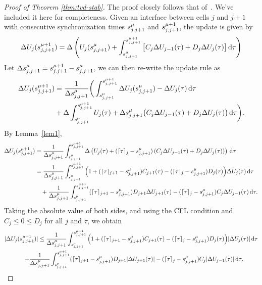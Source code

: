 \begin{proof}[Proof of Theorem \ref{thm:tvd-stab}]
The proof closely follows that of~\cite{Kirby2003}. We've included it here for completeness.
Given an interface between cells $j$ and $j+1$ with consecutive synchronization times $s^{\mu}_{j,j+1}$ and $s^{\mu+1}_{j,j+1}$, the update is given by
\begin{equation*}
\Delta U_j (s^{\mu+1}_{j,j+1}) = \Delta \left( U_j(s^{\mu}_{j,j+1}) + \int_{s^{\mu}_{j,j+1}}^{s^{\mu+1}_{j,j+1}} \big[ C_j \Delta U_{j-1} (\tau) + D_j \Delta U_{j} (\tau) \big] \,\mathrm{d} \tau \right)
\end{equation*}
Let $\Delta s^{\mu}_{j,j+1} = s^{\mu+1}_{j,j+1} - s^{\mu}_{j,j+1}$, we can then re-write the update rule as
\begin{align*}
\Delta U_j (s^{\mu+1}_{j,j+1} ) &= \frac{1}{\Delta s^{\mu}_{j,j+1}} \bigg( \int_{s^{\mu}_{j,j+1}}^{s^{\mu+1}_{j,j+1}} \Delta U_j(s^{\mu}_{j,j+1}) - \Delta U_j(\tau) \,\mathrm{d} \tau \\
& + \Delta \int_{s^{\mu}_{j,j+1}}^{s^{\mu+1}_{j,j+1}} U_j(\tau) + \Delta s^{\mu}_{j,j+1} \big( C_j \Delta U_{j-1}(\tau) + D_j \Delta U_j(\tau) \big) \,\mathrm{d} \tau \bigg). \\
\end{align*}
By Lemma~\ref{lem1},
\begin{align*}
\Delta U_j (s^{\mu+1}_{j,j+1} ) &= \frac{1}{\Delta s^{\mu}_{j,j+1}} \int_{s^{\mu}_{j,j+1}}^{s^{\mu+1}_{j,j+1}} 
\Delta \left( U_j(\tau) +  (\lceil \tau \rceil_j - s^{\mu}_{j,j+1} ) \left( C_j \Delta U_{j-1}(\tau) + D_j \Delta U_j(\tau) \right) \right)\,\mathrm{d} \tau\\
&= \frac{1}{\Delta s^{\mu}_{j,j+1}} \int_{s^{\mu}_{j,j+1}}^{s^{\mu+1}_{j,j+1}} \Big( 1 + ( \lceil \tau \rceil_{j+1} - s^{\mu}_{j,j+1} ) C_{j+1}(\tau) - ( \lceil \tau \rceil_j - s^{\mu}_{j,j+1} ) D_{j}(\tau) \Big) \Delta U_j(\tau) \,\mathrm{d} \tau\\
&\quad + \frac{1}{\Delta s^{\mu}_{j,j+1}} \int_{s^{\mu}_{j,j+1}}^{s^{\mu+1}_{j,j+1}} ( \lceil \tau \rceil_{j+1} - s^{\mu}_{j,j+1} ) D_{j+1} \Delta U_{j+1}(\tau) - ( \lceil \tau \rceil_j - s^{\mu}_{j,j+1} )  C_j \Delta U_{j-1} (\tau) \,\mathrm{d} \tau.
\end{align*}
Taking the absolute value of both sides, and using the CFL condition and $C_j \le 0 \le D_j$ for all $j$ and $\tau$, we obtain
\begin{multline}  \label{eq:thm1-pfa}
|\Delta U_j (\ssyncnext)| \le \frac{1}{\Delta \ssync} \int_{\ssync}^{\ssyncnext} \Big( 1 + ( \lceil \tau \rceil_{j+1} - \ssync ) C_{j+1}(\tau) - ( \lceil \tau \rceil_j - \ssync ) D_{j}(\tau) \Big) |\Delta U_j(\tau)| \,\mathrm{d} \tau\\
\quad + \frac{1}{\Delta \ssync} \int_{\ssync}^{\ssyncnext} ( \lceil \tau \rceil_{j+1} - \ssync )D_{j+1} |\Delta U_{j+1}(\tau)| - ( \lceil \tau \rceil_j - \ssync ) C_j |\Delta U_{j-1} (\tau)| \,\mathrm{d} \tau.

\end{multline}
\end{proof}
